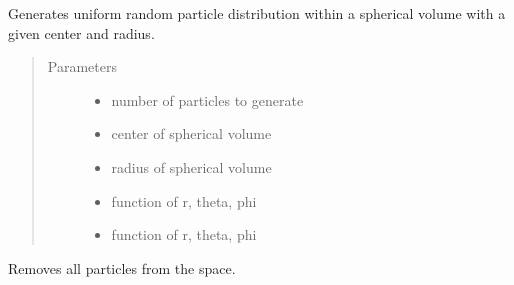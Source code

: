\documentclass[letterpaper,10pt,english]{sphinxmanual}
\begin{document}
\begin{itemize}
\begin{fulllineitems}
\begin{fulllineitems}
\label{\detokenize{space:nbody.simulator.space.Space.add_sphere}}
\sphinxAtStartPar
Generates uniform random particle distribution within a spherical volume
with a given center and radius.
\begin{quote}\begin{description}
\item[{Parameters}] \leavevmode\begin{itemize}
\item {} 
\sphinxAtStartPar
{} \textendash{} number of particles to generate

\item {} 
\sphinxAtStartPar
{} \textendash{} center of spherical volume

\item {} 
\sphinxAtStartPar
{} \textendash{} radius of spherical volume

\item {} 
\sphinxAtStartPar
{} \textendash{} function of r, theta, phi

\item {} 
\sphinxAtStartPar
{} \textendash{} function of r, theta, phi

\end{itemize}

\end{description}\end{quote}

\end{fulllineitems}


\begin{fulllineitems}
\label{\detokenize{space:nbody.simulator.space.Space.clear_particles}}
\sphinxAtStartPar
Removes all particles from the space.

\end{fulllineitems}


\end{fulllineitems}
\end{itemize}
\end{document}
